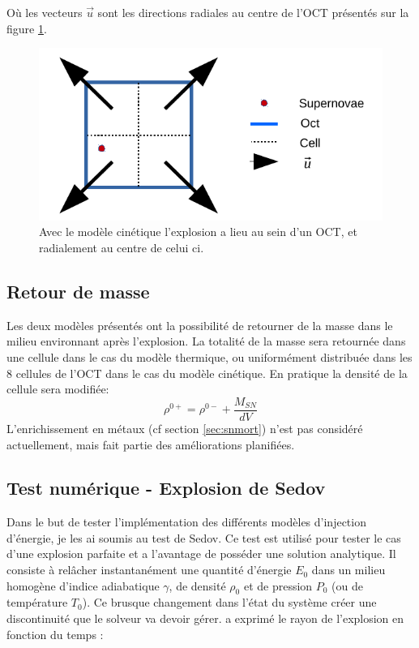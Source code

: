 Où les vecteurs $\overrightarrow{u}$ sont les directions radiales au centre de l'OCT présentés sur la figure \ref{fig:kin}.

\begin{figure}
        \includegraphics[width=.95\linewidth]{img/03/oct_kinetic.pdf} 
        \caption[Injection d'énergie cinétique]{Avec le modèle cinétique l'explosion a lieu au sein d'un OCT, et radialement au centre de celui ci.
 		\label{fig:kin}}
\end{figure}

\subsection{Retour de masse}
Les deux modèles présentés ont la possibilité de retourner de la masse dans le milieu environnant après l'explosion.
La totalité de la masse sera retournée dans une cellule dans le cas du modèle thermique, ou uniformément distribuée dans les 8 cellules de l'OCT dans le cas du modèle cinétique.
En pratique la densité de la cellule sera modifiée:
\begin{equation}
\rho^{0+} = \rho^{0-} + \frac{M_{SN}}{dV}
\end{equation}
L’enrichissement en métaux (cf section \ref{sec:snmort}) n'est pas considéré actuellement, mais fait partie des améliorations planifiées.

\subsection{Test numérique - Explosion de Sedov}
\label{sec:sedov}


Dans le but de tester l'implémentation des différents modèles d'injection d'énergie, je les ai soumis au test de Sedov.
Ce test est utilisé pour tester le cas d'une explosion parfaite et a l'avantage de posséder une solution analytique.
Il consiste à relâcher instantanément une quantité d'énergie $E_0$ dans un milieu homogène d'indice adiabatique $\gamma$, de densité $\rho_0$ et de pression $P_0$ (ou de température $T_0$).
Ce brusque changement dans l'état du système créer une discontinuité que le solveur va devoir gérer.
\cite{sedov_similarity_1959} a exprimé le rayon de l'explosion en fonction du temps  : 

